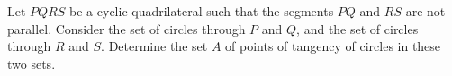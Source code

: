 Let $PQRS$ be a cyclic quadrilateral such that the segments $PQ$ and $RS$ are not parallel. Consider the set of circles through $P$ and $Q$, and the set of circles through $R$ and $S$. Determine the set $A$ of points of tangency of circles in these two sets.